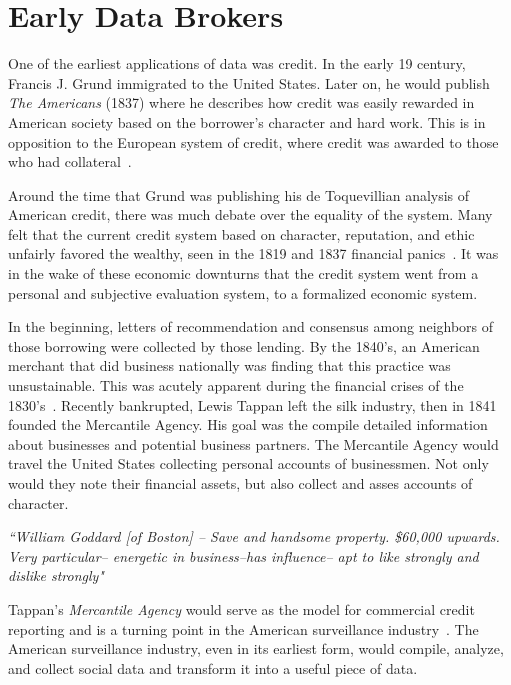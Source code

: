 \section{Early Data Brokers}

One of the earliest applications of data was credit. In the early 19
century, Francis J. Grund immigrated to the United States. Later on, he would
publish \textit{The Americans} (1837) where he describes how credit was easily
rewarded in American society based on the borrower's character and hard work.
This is in opposition to the European system of credit, where credit was
awarded to those who had collateral~\cite{lauer2017creditworthy}.

Around the time that Grund was publishing his de Toquevillian analysis of
American credit, there was much debate over the equality of the system.
Many felt that the current credit system based on character, reputation, and
ethic unfairly favored the wealthy, seen in the 1819 and 1837 financial
panics~\cite{lauer2017creditworthy}. It was in the wake of these economic
downturns that the credit system went from a personal and subjective evaluation
system, to a formalized economic system.

In the beginning, letters of recommendation and consensus among neighbors of
those borrowing were collected by those lending. By the 1840's, an American
merchant that did business nationally was finding that this practice was
unsustainable. This was acutely apparent during the financial crises of the
1830's~\cite{lauer2017creditworthy}. Recently bankrupted, Lewis Tappan left the
silk industry, then in 1841 founded the Mercantile Agency. His goal was the
compile detailed information about businesses and potential business partners.
The Mercantile Agency would travel the United States collecting personal accounts
of businessmen. Not only would they note their financial assets, but also
collect and asses accounts of character.

\begin{center} \textit{
		``William Goddard [of Boston] -- Save and handsome property. \$60,000 upwards.
		Very particular-- energetic in business--has influence-- apt to like strongly
		and dislike strongly"}
\end{center}

Tappan's \textit{Mercantile Agency} would serve as the model for commercial
credit reporting and is a turning point in the American surveillance
industry~\cite{lauer2017creditworthy}. The American surveillance industry,
even in its earliest form, would compile, analyze, and collect social data and
transform it into a useful piece of data.

